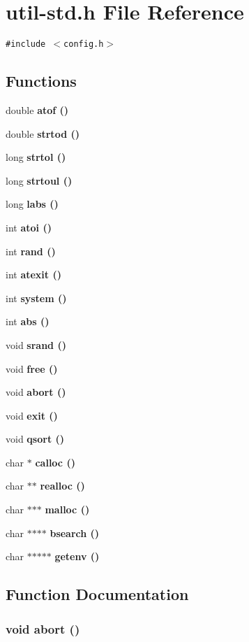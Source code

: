\section{util-std.h File Reference}
\label{util-std_8h}
{\tt \#include $<$config.h$>$}\par
\subsection*{Functions}
\begin{CompactItemize}
\item 
double \bf{atof} ()
\item 
double \bf{strtod} ()
\item 
long \bf{strtol} ()
\item 
long \bf{strtoul} ()
\item 
long \bf{labs} ()
\item 
int \bf{atoi} ()
\item 
int \bf{rand} ()
\item 
int \bf{atexit} ()
\item 
int \bf{system} ()
\item 
int \bf{abs} ()
\item 
void \bf{srand} ()
\item 
void \bf{free} ()
\item 
void \bf{abort} ()
\item 
void \bf{exit} ()
\item 
void \bf{qsort} ()
\item 
char $\ast$ \bf{calloc} ()
\item 
char $\ast$$\ast$ \bf{realloc} ()
\item 
char $\ast$$\ast$$\ast$ \bf{malloc} ()
\item 
char $\ast$$\ast$$\ast$$\ast$ \bf{bsearch} ()
\item 
char $\ast$$\ast$$\ast$$\ast$$\ast$ \bf{getenv} ()
\end{CompactItemize}


\subsection{Function Documentation}
\subsubsection{\setlength{\rightskip}{0pt plus 5cm}void abort ()}\label{util-std_8h_c54f53dc342019e8db34f4aa581a5792}



